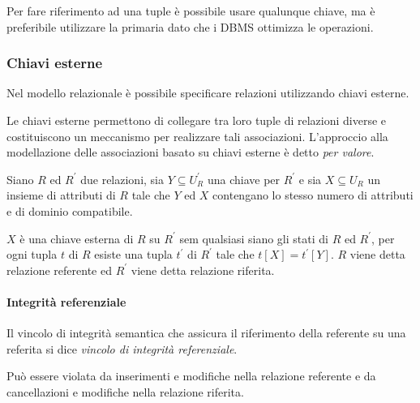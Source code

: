 Per fare riferimento ad una tuple è possibile usare qualunque chiave, ma è
preferibile utilizzare la primaria dato che i DBMS ottimizza le operazioni.

\subsubsection{Chiavi esterne}%
\label{ssub:Chiavi esterne}
Nel modello relazionale è possibile specificare relazioni utilizzando chiavi
esterne.

Le chiavi esterne permettono di collegare tra loro tuple di relazioni diverse e
costituiscono un meccanismo per realizzare tali associazioni.
L'approccio alla modellazione delle associazioni basato su chiavi esterne è
detto \emph{per valore}.

\begin{definizione}
Siano $R$ ed $R^\prime$ due relazioni, sia $Y\subseteq U_R^\prime$ una chiave
per $R^\prime$ e sia $X\subseteq U_R$ un insieme di attributi di $R$ tale che
$Y$ ed $X$ contengano lo stesso numero di attributi e di dominio compatibile.

$X$ è una chiave esterna di $R$ su $R^\prime$ sem qualsiasi siano gli stati di
$R$ ed $R^\prime$, per ogni tupla $t$ di $R$ esiste una tupla $t^\prime$ di
$R^\prime$ tale che $t[X]=t^\prime[Y]$.
$R$ viene detta relazione referente ed $R^\prime$ viene detta relazione
riferita.
\end{definizione}

\paragraph{Integrità referenziale}%
\label{par:Integrità referenziale}
Il vincolo di integrità semantica che assicura il riferimento della referente su
una referita si dice \emph{vincolo di integrità referenziale}.

Può essere violata da inserimenti e modifiche nella relazione referente e da
cancellazioni e modifiche nella relazione riferita.
